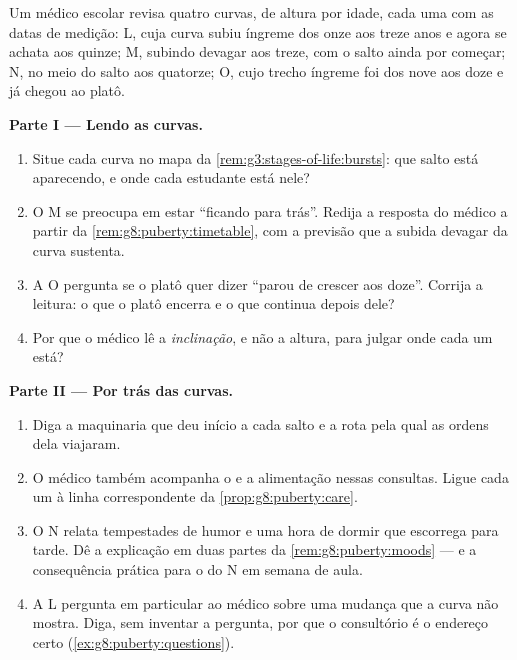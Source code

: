 \begin{problem}\label{pb:g8:puberty:1}
Um médico escolar revisa quatro curvas, de altura por idade, cada uma
com as datas de medição: L, cuja curva subiu íngreme dos onze aos
treze anos e agora se achata aos quinze; M, subindo devagar aos treze,
com o salto ainda por começar; N, no meio do salto aos quatorze; O,
cujo trecho íngreme foi dos nove aos doze e já chegou ao platô.

\medskip\noindent\textbf{Parte I --- Lendo as curvas.}
\begin{enumerate}
  \item Situe cada curva no mapa da
        \cref{rem:g3:stages-of-life:bursts}: que salto está
        aparecendo, e onde cada estudante está nele?
  \item O M se preocupa em estar ``ficando para trás''. Redija a
        resposta do médico a partir da
        \cref{rem:g8:puberty:timetable}, com a previsão que a subida
        devagar da curva sustenta.
  \item A O pergunta se o platô quer dizer ``parou de crescer aos
        doze''. Corrija a leitura: o que o platô encerra e o que
        continua depois dele?
  \item Por que o médico lê a \emph{inclinação}, e não a altura, para
        julgar onde cada um está?
\end{enumerate}

\medskip\noindent\textbf{Parte II --- Por trás das curvas.}
\begin{enumerate}[resume]
  \item Diga a maquinaria que deu início a cada salto e a rota pela
        qual as ordens dela viajaram.
  \item O médico também acompanha o  e a alimentação nessas
        consultas. Ligue cada um à linha correspondente da
        \cref{prop:g8:puberty:care}.
  \item O N relata tempestades de humor e uma hora de dormir que
        escorrega para tarde. Dê a explicação em duas partes da
        \cref{rem:g8:puberty:moods} --- e a consequência prática para o
         do N em semana de aula.
  \item A L pergunta em particular ao médico sobre uma mudança que a
        curva não mostra. Diga, sem inventar a pergunta, por que o
        consultório é o endereço certo (\cref{ex:g8:puberty:questions}).
\end{enumerate}


\end{problem}
